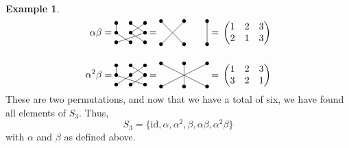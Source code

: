 \documentclass[svgnames]{article}
\theoremstyle{definition}
\newtheorem{Example}[Example]{Example}
\theoremstyle{remark}
\newcommand{\id}{\mathrm{id}}
\begin{document}
\begin{appendices}
\begin{Example}
\begin{align*}
\alpha\beta & = \,\vcenter{\xymatrix@R=1em@C=1.5em{
		*=0{\bullet} \ar@{-}[d]		&	*=0{\bullet} \ar@{-}[dr]	&	*=0{\bullet} \ar@{-}[dl]\\
		*=0{\bullet} \ar@{-}[dr]	&	*=0{\bullet} \ar@{-}[dr]	&	*=0{\bullet} \ar@{-}[dll]\\
		*=0{\bullet}				&	*=0{\bullet}				&	*=0{\bullet}\\		
}}\, = \,\vcenter{\xymatrix{
		*=0{\bullet} \ar@{-}[dr]	&	*=0{\bullet} \ar@{-}[dl]	&	*=0{\bullet} \ar@{-}[d]\\
		*=0{\bullet}				&	*=0{\bullet}				&	*=0{\bullet}\\
}}\, = \,\begin{pmatrix}
1 & 2 & 3\\
2 & 1 & 3
\end{pmatrix}\\
{}\\
\alpha^2\beta & = \,\vcenter{\xymatrix@R=1em@C=1.5em{
		*=0{\bullet} \ar@{-}[d]		&	*=0{\bullet} \ar@{-}[dr]	&	*=0{\bullet} \ar@{-}[dl]\\
		*=0{\bullet} \ar@{-}[drr]	&	*=0{\bullet} \ar@{-}[dl]	&	*=0{\bullet} \ar@{-}[dl]\\
		*=0{\bullet}				&	*=0{\bullet}				&	*=0{\bullet}\\		
}}\, = \,\vcenter{\xymatrix{
		*=0{\bullet} \ar@{-}[drr]	&	*=0{\bullet} \ar@{-}[d]	&	*=0{\bullet} \ar@{-}[dll]\\
		*=0{\bullet}				&	*=0{\bullet}				&	*=0{\bullet}\\
}}\, = \,\begin{pmatrix}
1 & 2 & 3\\
3 & 2 & 1
\end{pmatrix}
\end{align*}
These are two permutations, and now that we have a total of six, we have found all elements of $S_3$. Thus,
\begin{equation*}
S_3 = \{\id, \alpha, \alpha^2, \beta, \alpha\beta, \alpha^2 \beta\}
\end{equation*}
with $\alpha$ and $\beta$ as defined above.


\end{Example}
\end{appendices}
\end{document}
